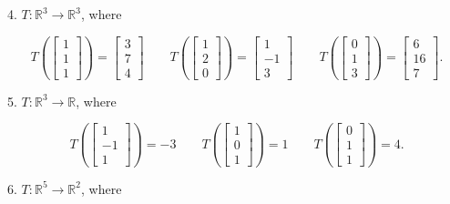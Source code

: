 \documentclass{article}
\begin{document}
4. $T: \mathbb{R}^3 \to \mathbb{R}^3$, where

$$
	T\left(\left[\begin{array}{c} 1 \\ 1 \\ 1 \end{array}\right]\right) = \left[\begin{array}{c} 3 \\ 7 \\ 4 \end{array}\right] \qquad T\left(\left[\begin{array}{c} 1 \\ 2 \\ 0 \end{array}\right]\right) = \left[\begin{array}{c} 1 \\ -1 \\ 3 \end{array}\right] \qquad T\left(\left[\begin{array}{c} 0 \\ 1 \\ 3 \end{array}\right]\right) = \left[\begin{array}{c} 6 \\ 16 \\ 7 \end{array}\right].
$$

5. $T: \mathbb{R}^3 \to \mathbb{R}$, where

$$
	T\left(\left[\begin{array}{c} 1 \\ -1 \\ 1 \end{array}\right]\right) = -3 \qquad T\left(\left[\begin{array}{c} 1 \\ 0 \\ 1 \end{array}\right]\right) = 1 \qquad T\left(\left[\begin{array}{c} 0 \\ 1 \\ 1 \end{array}\right]\right) = 4.
$$

6. $T: \mathbb{R}^5 \to \mathbb{R}^2$, where
\end{document}
